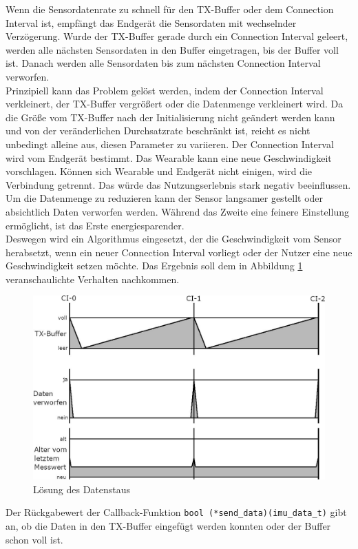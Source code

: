 Wenn die Sensordatenrate zu schnell für den TX-Buffer oder dem Connection Interval ist, empfängt das Endgerät die Sensordaten mit wechselnder Verzögerung.
Wurde der TX-Buffer gerade durch ein Connection Interval geleert, werden alle nächsten Sensordaten in den Buffer eingetragen, bis der Buffer voll ist.
Danach werden alle Sensordaten bis zum nächsten Connection Interval verworfen.\\
Prinzipiell kann das Problem gelöst werden, indem der Connection Interval verkleinert, der TX-Buffer vergrößert oder die Datenmenge verkleinert wird.
Da die Größe vom TX-Buffer nach der Initialisierung nicht geändert werden kann und von der veränderlichen Durchsatzrate beschränkt ist, reicht es nicht unbedingt alleine aus, diesen Parameter zu variieren.
Der Connection Interval wird vom Endgerät bestimmt.
Das Wearable kann eine neue Geschwindigkeit vorschlagen.
Können sich Wearable und Endgerät nicht einigen, wird die Verbindung getrennt.
Das würde das Nutzungserlebnis stark negativ beeinflussen.
Um die Datenmenge zu reduzieren kann der Sensor langsamer gestellt oder absichtlich Daten verworfen werden.
Während das Zweite eine feinere Einstellung ermöglicht, ist das Erste energiesparender.\\
Deswegen wird ein Algorithmus eingesetzt, der die Geschwindigkeit vom Sensor herabsetzt, wenn ein neuer Connection Interval vorliegt oder der Nutzer eine neue Geschwindigkeit setzen möchte.
Das Ergebnis soll dem in Abbildung \ref{fig:daten_nachher} veranschaulichte Verhalten nachkommen.
\begin{figure}[!hbtp]
	\centering
	\includegraphics[width=0.76\linewidth]{res/datenNachher.jpg}
	\caption{Lösung des Datenstaus}
	\label{fig:daten_nachher}
\end{figure}
Der Rückgabewert der Callback-Funktion \texttt{bool (*send\_data)(imu\_data\_t)} gibt an, ob die Daten in den TX-Buffer eingefügt werden konnten oder der Buffer schon voll ist.
